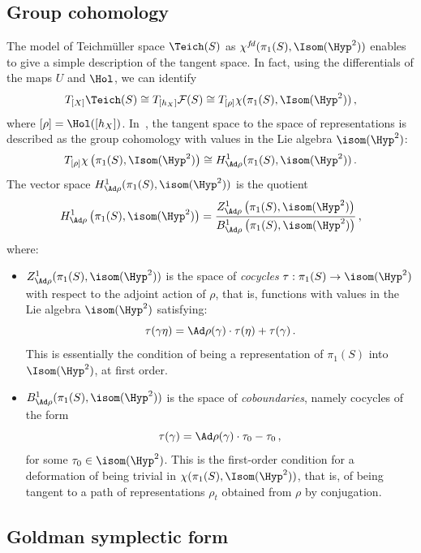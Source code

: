 \subsection{Group cohomology}\label{sect2.2}

The model of Teichm\"uller space $\Teich(S)$ as $\chi^{f\!d}(\pi_1(S),\Isom(\Hyp^2))$ enables to give a simple description of the tangent space. In fact, using the differentials of the maps $U$ and $\Hol$, we can identify
\[
T_{[X]}\Teich(S)\cong T_{[h_X]}\mathcal F(S)\cong T_{[\rho]}\chi(\pi_1(S),\Isom(\Hyp^2))\,,
\]
where $[\rho]=\Hol([h_X])$. In~\cite{Goldman}, the tangent space to the space of representations is described as the group cohomology with values in the Lie algebra $\isom(\Hyp^2)$:
\[
T_{[\rho]}\chi\left(\pi_1(S),\Isom(\Hyp^2)\right)\cong H^1_{\Ad\rho}(\pi_1(S),\isom(\Hyp^2))\,.
\]
The vector space $H^1_{\Ad\rho}(\pi_1(S),\isom(\Hyp^2))$ is the quotient
\[
H^1_{\Ad\rho}\left(\pi_1(S),\isom(\Hyp^2)\right)=\frac{Z^1_{\Ad\rho}\left(\pi_1(S),\isom(\Hyp^2)\right)}{B^1_{\Ad\rho}\left(\pi_1(S),\isom(\Hyp^2)\right)}\,,
\]
where:
\begin{itemize}
\item $Z^1_{\Ad\rho}(\pi_1(S),\isom(\Hyp^2))$ is the space of \emph{cocycles} $\tau:\pi_1(S)\to\isom(\Hyp^2)$ with respect to the adjoint action of $\rho$, that is, functions with values in the Lie algebra $\isom(\Hyp^2)$ satisfying:
\begin{equation}\label{eq cocycle condition}
\tau(\gamma\eta)=\Ad\rho(\gamma)\cdot\tau(\eta)+\tau(\gamma)\,.
\end{equation}
This is essentially the condition of being a representation of $\pi_1(S)$ into $\Isom(\Hyp^2)$, at first order.
\item $B^1_{\Ad\rho}(\pi_1(S),\isom(\Hyp^2))$ is the space of \emph{coboundaries}, namely cocycles of the form
\begin{equation}\label{eq defi coboundary}
\tau(\gamma)=\Ad\rho(\gamma)\cdot\tau_0-\tau_0\,,
\end{equation}
for some $\tau_0\in\isom(\Hyp^2)$. This is the first-order condition for a deformation of being trivial in $\chi(\pi_1(S),\Isom(\Hyp^2))$, that is, of being tangent to a path of representations $\rho_t$ obtained from $\rho$ by conjugation.
\end{itemize}

\subsection{Goldman symplectic form}


